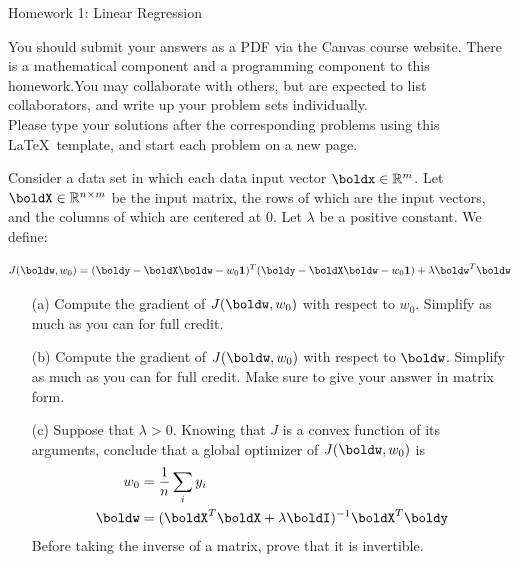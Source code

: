 \documentclass[submit]{harvardml}
\begin{document}
\begin{center}
{\Large Homework 1: Linear Regression}\\
\end{center}
You should submit your answers as a PDF via the Canvas course website.  There is a mathematical component and a programming component to this homework.You may collaborate with others, but are expected to list collaborators, and write up your problem sets individually.\\

\noindent
Please type your solutions after the corresponding problems using this \LaTeX\ template, and start each problem on a new page.\\

\begin{problem}

Consider a data set in which each data input vector $\boldx \in \mathbb{R}^m$. Let $\boldX \in
\mathbb{R}^{n \times m}$ be the input matrix, the rows of which are the input
vectors, and the columns of which are centered at 0. Let $\lambda$ be a positive constant. We define:

$$J(\boldw, w_0) = (\boldy - \boldX \boldw - w_0 {\bf 1 })^T (\boldy - \boldX
\boldw - w_0 {\bf 1 }) + \lambda \boldw^T \boldw$$

\begin{itemize}
  \item[(a)] Compute the gradient of $J(\boldw, w_0)$ with respect to $w_0$.
    Simplify as much as you can for full credit.
  \item[(b)] Compute the gradient of $J(\boldw, w_0)$ with respect to $\boldw$.
    Simplify as much as you can for full credit. Make sure to give your answer
    in matrix form.
  \item[(c)] Suppose that $\lambda > 0$. Knowing that $J$ is a convex function
    of its arguments, conclude that a global optimizer of
    $J(\boldw, w_0)$ is
    \begin{align}
      w_0 &= \frac{1}{n} \sum_i y_i \\
      \boldw &= (\boldX^T \boldX + \lambda \boldI)^{-1} \boldX^T \boldy
    \end{align}
    Before taking the inverse of a matrix, prove that it is invertible.
\end{itemize}
\end{problem}
\end{document}
